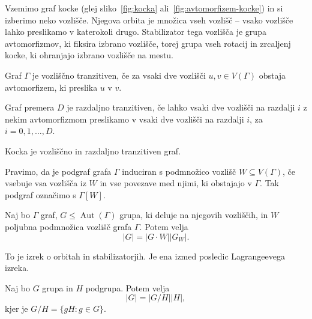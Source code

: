\documentclass[fin1, tisk]{fmfdelo}
\newcommand{\aut}{\operatorname{Aut}}
\begin{document}
\begin{zgled}
    Vzemimo graf kocke (glej sliko~\ref{fig:kocka} ali~\ref{fig:avtomorfizem-kocke}) in si izberimo neko vozlišče. Njegova orbita je množica
    vseh vozlišč -- vsako vozlišče lahko preslikamo v katerokoli drugo. Stabilizator tega vozlišča
    je grupa avtomorfizmov, ki fiksira izbrano vozlišče, torej grupa vseh rotacij in zrcaljenj kocke, ki ohranjajo izbrano vozlišče na mestu.
\end{zgled}

\begin{definicija}
    Graf $\Gamma$ je vozliščno tranzitiven, če za vsaki dve vozlišči $u, v \in V(\Gamma)$ obstaja 
    avtomorfizem, ki preslika $u$ v $v$.
\end{definicija}

\begin{definicija}
    Graf premera $D$ je razdaljno tranzitiven, če lahko vsaki dve vozlišči na razdalji $i$ z nekim avtomorfizmom preslikamo
    v vsaki dve vozlišči na razdalji $i$, za $i = 0, 1, \ldots, D$.
\end{definicija}

\begin{zgled}
    Kocka je vozliščno in razdaljno tranzitiven graf.
\end{zgled}

\begin{definicija}
    Pravimo, da je podgraf grafa $\Gamma$ induciran s podmnožico vozlišč $W \subseteq V(\Gamma)$, če vsebuje vsa vozlišča 
    iz $W$ in vse povezave med njimi, ki obstajajo v $\Gamma$. Tak podgraf označimo s $\Gamma[W]$.
\end{definicija}

\begin{izrek}\label{iz:orbitainstabilizator}
    Naj bo $\Gamma$ graf, $G \leq \aut(\Gamma)$ grupa, ki deluje na njegovih vozliščih,
    in $W$ poljubna podmnožica vozlišč grafa $\Gamma$. Potem velja
    $$|G| = |G\cdot W| |G_W|.$$
\end{izrek}

\begin{opomba}
    To je izrek o orbitah in stabilizatorjih. Je ena izmed posledic Lagrangeevega izreka.
\end{opomba}

\begin{izrek}\label{iz:lagrangeevizrek}
    Naj bo $G$ grupa in $H$ podgrupa. Potem velja 
    $$|G| = |G/H| |H|,$$
    kjer je $G/H = \{gH : g \in G\}$.
\end{izrek}
\end{document}
